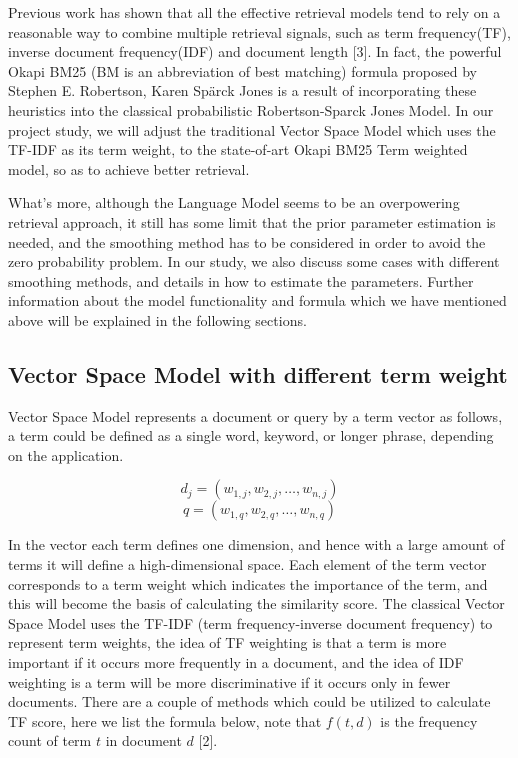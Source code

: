 \documentclass{article}
\begin{document}
Previous work has shown that all the effective retrieval models tend to rely on a reasonable way to combine multiple retrieval signals, such as term frequency(TF), inverse document frequency(IDF) and document length [3]. In fact, the powerful Okapi BM25 (BM is an abbreviation of best matching) formula proposed by Stephen E. Robertson, Karen Spärck Jones is a result of incorporating these heuristics into the classical probabilistic Robertson-Sparck Jones Model. In our project study, we will adjust the traditional Vector Space Model which uses the TF-IDF as its term weight, to the state-of-art Okapi BM25 Term weighted model, so as to achieve better retrieval.  

What's more, although the Language Model seems to be an overpowering retrieval approach, it still has some limit that the prior parameter estimation is needed, and the smoothing method has to be considered in order to avoid the zero probability problem. In our study, we also discuss some cases with different smoothing methods, and details in how to estimate the parameters. Further information about the model functionality and formula which we have mentioned above will be explained in the following sections.

\subsection{Vector Space Model with different term weight}
Vector Space Model represents a document or query by a term vector as follows, a term could be defined as a single word, keyword, or longer phrase, depending on the application.

$$ d_j = (w_{1,j}, w_{2,j}, \ldots, w_{n,j}) $$
$$ q = (w_{1,q}, w_{2,q}, \ldots, w_{n,q}) $$

In the vector each term defines one dimension, and hence with a large amount of terms it will define a high-dimensional space. Each element of the term vector corresponds to a term weight which indicates the importance of the term, and this will become the basis of calculating the similarity score. The classical Vector Space Model uses the TF-IDF (term frequency-inverse document frequency) to represent term weights, the idea of TF weighting is that a term is more important if it occurs more frequently in a document, and the idea of IDF weighting is a term will be more discriminative if it occurs only in fewer documents. There are a couple of methods which could be utilized to calculate TF score, here we list the formula below, note that $f(t, d)$ is the frequency count of term $t$ in document $d$ [2].
\end{document}
